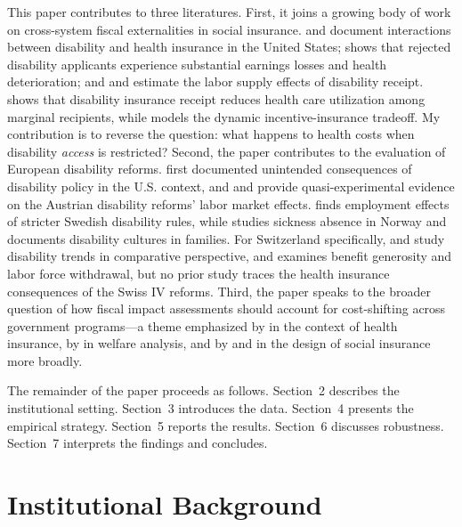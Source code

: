 \documentclass[12pt]{article}
\begin{document}
This paper contributes to three literatures. First, it joins a growing body of work on cross-system fiscal externalities in social insurance. \citet{duggan2010effect} and \citet{maestas2013does} document interactions between disability and health insurance in the United States; \citet{bound1989disability} shows that rejected disability applicants experience substantial earnings losses and health deterioration; and \citet{french2012effects} and \citet{gelber2017earnings} estimate the labor supply effects of disability receipt. \citet{autor2015does} shows that disability insurance receipt reduces health care utilization among marginal recipients, while \citet{low2015disability} models the dynamic incentive-insurance tradeoff. My contribution is to reverse the question: what happens to health costs when disability \emph{access} is restricted? Second, the paper contributes to the evaluation of European disability reforms. \citet{deleire2000unintended} first documented unintended consequences of disability policy in the U.S. context, and \citet{staubli2011impact} and \citet{staubli2014does} provide quasi-experimental evidence on the Austrian disability reforms' labor market effects. \citet{karlstrom2008disability} finds employment effects of stricter Swedish disability rules, while \citet{markussen2011closing} studies sickness absence in Norway and \citet{dahl2014peer} documents disability cultures in families. For Switzerland specifically, \citet{borghans2014disability} and \citet{dewind2016disability} study disability trends in comparative perspective, and \citet{mullen2016effect} examines benefit generosity and labor force withdrawal, but no prior study traces the health insurance consequences of the Swiss IV reforms. Third, the paper speaks to the broader question of how fiscal impact assessments should account for cost-shifting across government programs---a theme emphasized by \citet{finkelstein2019take} in the context of health insurance, by \citet{hendren2020unified} in welfare analysis, and by \citet{kolsrud2023costs} and \citet{chetty2008moral} in the design of social insurance more broadly.

The remainder of the paper proceeds as follows. Section~2 describes the institutional setting. Section~3 introduces the data. Section~4 presents the empirical strategy. Section~5 reports the results. Section~6 discusses robustness. Section~7 interprets the findings and concludes.


\section{Institutional Background}
\end{document}
